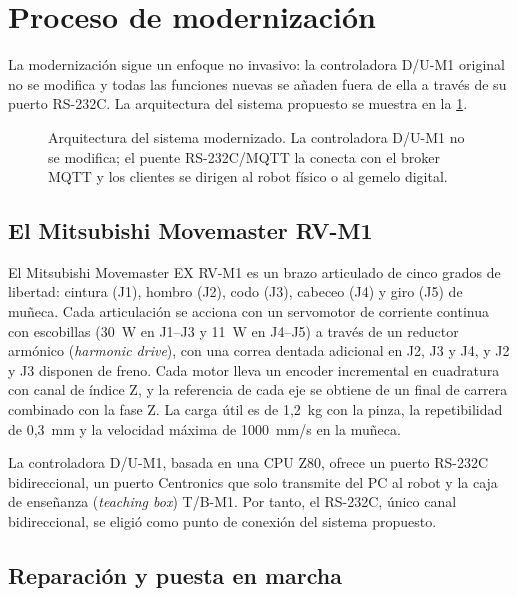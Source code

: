 \section{Proceso de modernización}\label{sec:modernisation}

La modernización sigue un enfoque no invasivo: la controladora D/U-M1 original no se modifica y todas las funciones nuevas se añaden fuera de ella a través de su puerto RS-232C. La arquitectura del sistema propuesto se muestra en la \cref{fig:architecture}.

\begin{figure}[t]
  \centering
  \caption{Arquitectura del sistema modernizado. La controladora D/U-M1 no se modifica; el puente RS-232C/MQTT la conecta con el broker MQTT y los clientes se dirigen al robot físico o al gemelo digital.}
  \label{fig:architecture}
\end{figure}

\subsection{El Mitsubishi Movemaster RV-M1}

El Mitsubishi Movemaster EX RV-M1 es un brazo articulado de cinco grados de libertad: cintura (J1), hombro (J2), codo (J3), cabeceo (J4) y giro (J5) de muñeca. Cada articulación se acciona con un servomotor de corriente continua con escobillas (30~W en J1--J3 y 11~W en J4--J5) a través de un reductor armónico (\textit{harmonic drive}), con una correa dentada adicional en J2, J3 y J4, y J2 y J3 disponen de freno. Cada motor lleva un encoder incremental en cuadratura con canal de índice Z, y la referencia de cada eje se obtiene de un final de carrera combinado con la fase Z. La carga útil es de 1,2~kg con la pinza, la repetibilidad de 0,3~mm y la velocidad máxima de 1000~mm/s en la muñeca.

La controladora D/U-M1, basada en una CPU Z80, ofrece un puerto RS-232C bidireccional, un puerto Centronics que solo transmite del PC al robot y la caja de enseñanza (\textit{teaching box}) T/B-M1. Por tanto, el RS-232C, único canal bidireccional, se eligió como punto de conexión del sistema propuesto.

\subsection{Reparación y puesta en marcha}

